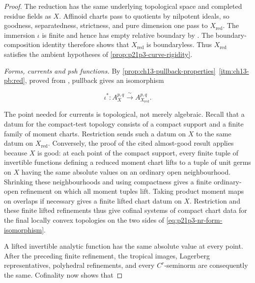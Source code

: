 
\begin{proof}
The reduction has the same underlying topological space and completed
residue fields as \(X\).  Affinoid charts pass to quotients by nilpotent
ideals, so goodness, separatedness, strictness, and pure dimension one pass
to \(X_{\mathrm{red}}\).  The immersion \(\iota\) is finite and hence has
empty relative boundary by \cite[\S11.4.4]{CLD25}.  The
boundary-composition identity
\cite[(11.4.1.3)]{CLD25} therefore shows that
\(X_{\mathrm{red}}\) is boundaryless.  Thus \(X_{\mathrm{red}}\) satisfies
the ambient hypotheses of \cref{prop:p21p3-curve-rigidity}.

\smallskip
\emph{Forms, currents and psh functions.}
By \cref{prop:ch13-pullback-properties}\,
\cref{itm:ch13-pb:red}, proved from
\cite[Proposition~15.1.3(b) and the following form variant]{CLD25}, pullback
gives an isomorphism

\begin{equation}
\label{eq:p21p3-nr-form-isomorphism}
       \iota^*:A_X^{p,q}\xrightarrow{\ \sim\ }
                       A_{X_{\mathrm{red}}}^{p,q}.
\end{equation}

The point needed for currents is topological, not merely algebraic.  Recall
that a datum for the compact-test topology consists of a compact support and
a finite family of moment charts.  Restriction sends such a datum on \(X\)
to the same datum on \(X_{\mathrm{red}}\).  Conversely, the proof of the
cited almost-good result applies because \(X\) is good: at each point of the
compact support, every finite tuple of invertible functions defining a
reduced moment chart lifts to a tuple of unit germs on \(X\) having the same
absolute values on an ordinary open neighbourhood.  Shrinking these
neighbourhoods and using compactness gives a finite ordinary-open refinement
on which all moment tuples lift.  Taking product moment maps on overlaps if
necessary gives a finite lifted chart datum on \(X\).  Restriction and these
finite lifted refinements thus give cofinal systems of compact chart data for
the final locally convex topologies on the two sides of
\eqref{eq:p21p3-nr-form-isomorphism}.

A lifted invertible analytic function has the same absolute value at every
point.  After the preceding finite refinement, the tropical images,
Lagerberg representatives, polyhedral refinements, and every
\(C^r\)-seminorm are consequently the same.  Cofinality now shows that


\end{proof}
